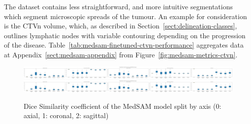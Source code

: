 \documentclass[11pt,twoside]{report}
\begin{document}
The dataset contains less straightforward, and more intuitive segmentations which segment microscopic spreads of the tumour. An example for consideration is the CTVn volume, which, as described in Section~\ref{sect:delineation-classes}, outlines lymphatic nodes with variable contouring depending on the progression of the disease. Table~\ref{tab:medsam-finetuned-ctvn-performance} aggregates data at Appendix~\ref{sect:medsam-appendix} from Figure~\ref{fig:medsam-metrics-ctvn}.

\begin{table}[h!]
  \centering
  \caption{Performance of models on the CTVn delineation.}
  \label{tab:medsam-finetuned-ctvn-performance}
\end{table}

\begin{figure}[H]
  \centering
  \includegraphics[height=.23\textheight, trim=1350px 0 5220px 0, clip]{../../research/source/code/data/metrics/metricsctvn_1_combinednotable_MedSAM_split_analysis.png}
  \includegraphics[height=.23\textheight, trim=2125px 0 4040px 0, clip]{../../research/source/code/data/metrics/metricsctvn_1_combinednotable_MedSAM_split_analysis.png}

  \caption{Dice Similarity coefficient of the MedSAM model split by axis (0: axial, 1: coronal, 2: sagittal)}\label{fig:medsam-finetuned-axis-split}
\end{figure}
\end{document}
